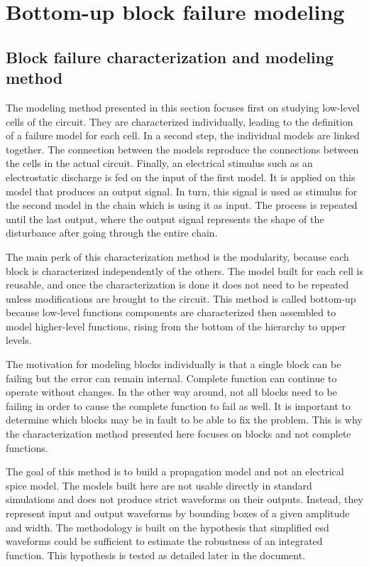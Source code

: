 \section{Bottom-up block failure modeling}
\label{sec:bottom-up-modeling}

\subsection{Block failure characterization and modeling method}
\label{sec:block-failure-cz}

The modeling method presented in this section focuses first on studying low-level cells of the circuit.
They are characterized individually, leading to the definition of a failure model for each cell.
In a second step, the individual models are linked together.
The connection between the models reproduce the connections between the cells in the actual circuit.
Finally, an electrical stimulus such as an electrostatic discharge is fed on the input of the first model.
It is applied on this model that produces an output signal.
In turn, this signal is used as stimulus for the second model in the chain which is using it as input.
The process is repeated until the last output, where the output signal represents the shape of the disturbance after going through the entire chain.

The main perk of this characterization method is the modularity, because each block is characterized independently of the others.
The model built for each cell is reusable, and once the characterization is done it does not need to be repeated unless modifications are brought to the circuit.
This method is called bottom-up because low-level functions components are characterized then assembled to model higher-level functions, rising from the bottom of the hierarchy to upper levels.

The motivation for modeling blocks individually is that a single block can be failing but the error can remain internal.
Complete function can continue to operate without changes.
In the other way around, not all blocks need to be failing in order to cause the complete function to fail as well.
It is important to determine which blocks may be in fault to be able to fix the problem.
This is why the characterization method presented here focuses on blocks and not complete functions.

The goal of this method is to build a propagation model and not an electrical \gls{spice} model.
The models built here are not usable directly in standard simulations and does not produce strict waveforms on their outputs.
Instead, they represent input and output waveforms by bounding boxes of a given amplitude and width.
The methodology is built on the hypothesis that simplified \gls{esd} waveforms could be sufficient to estimate the robustness of an integrated function.
This hypothesis is tested as detailed later in the document.

